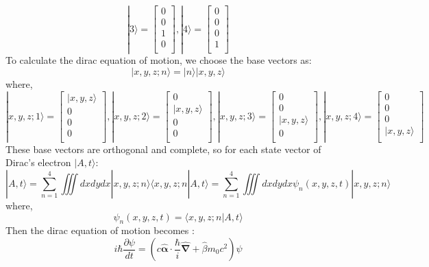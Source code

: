 \documentclass[12pt]{article}
\numberwithin{equation}{section}
\begin{document}
\begin{enumerate}
\[	|3\rangle=\begin{bmatrix}0\\ 0\\ 1\\ 0\\\end{bmatrix}, 
	|4\rangle=\begin{bmatrix}0\\ 0\\ 0\\ 1\\\end{bmatrix}\]
	To calculate the dirac equation of motion, we choose the base vectors as:
	\begin{equation}|x,y,z;n\rangle=|n\rangle|x,y,z\rangle\end{equation}
	where,
	\[|x,y,z;1\rangle=\begin{bmatrix}|x,y,z\rangle\\ 0\\ 0\\ 0\\ \end{bmatrix},
	|x,y,z;2\rangle=\begin{bmatrix}0\\ |x,y,z\rangle\\ 0\\ 0\\ \end{bmatrix},
	|x,y,z;3\rangle=\begin{bmatrix}0\\ 0\\ |x,y,z\rangle\\ 0\\ \end{bmatrix},
	|x,y,z;4\rangle=\begin{bmatrix}0\\ 0\\ 0\\ |x,y,z\rangle\\ \end{bmatrix}\]
	These base vectors are orthogonal and complete, so for each state vector of Dirac's electron $|A,t\rangle$:
	\[|A,t\rangle=\sum_{n=1}^4\iiint dxdydx |x,y,z;n\rangle\langle x,y,z;n|A,t\rangle=\sum_{n=1}^4\iiint dxdydx\psi_n(x,y,z,t) |x,y,z;n\rangle\]
	where,
	\[\psi_n(x,y,z,t)=\langle x,y,z;n|A,t\rangle\]
	Then the dirac equation of motion becomes :
	\begin{equation}
		i\hbar\frac{\partial{\psi}}{dt}=
		(c\hat{\bm{\alpha}}\cdot\frac{\hbar}{i}\hat{\bm{\nabla}}+\hat{\beta} m_0c^2)\psi

\end{equation}
\end{enumerate}
\end{document}
